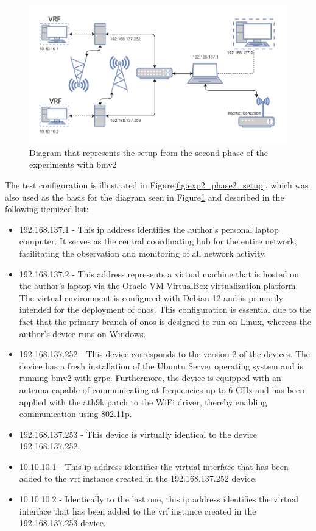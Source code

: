 \begin{figure}
	\centering
	\includegraphics[width=\textwidth]{Chapters/Figures/tests/bmv2_phase_2/setup_diagram.PNG}
	\caption{Diagram that represents the setup from the second phase of the experiments with \gls{bmv2}}
	\label{fig:exp2_phase2_diagram}
\end{figure}


The test configuration is illustrated in Figure\ref{fig:exp2_phase2_setup}, which was also used as the basis for the diagram seen in Figure\ref{fig:exp2_phase2_diagram} and described in the following itemized list:

\begin{itemize}
	\item 192.168.137.1 - This \gls{ip} address identifies the author's personal laptop computer. It serves as the central coordinating hub for the entire network, facilitating the observation and monitoring of all network activity.
	\item 192.168.137.2 - This address represents a virtual machine that is hosted on the author's laptop via the Oracle VM VirtualBox virtualization platform. The virtual environment is configured with Debian 12 and is primarily intended for the deployment of \gls{onos}. This configuration is essential due to the fact that the primary branch of \gls{onos} is designed to run on Linux, whereas the author's device runs on Windows.
	\item 192.168.137.252 - This device corresponds to the version 2 of the devices. The device has a fresh installation of the Ubuntu Server operating system and is running \gls{bmv2} with grpc. Furthermore, the device is equipped with an antenna capable of communicating at frequencies up to 6 GHz and has been applied with the ath9k patch to the WiFi driver, thereby enabling communication using 802.11p.
	\item 192.168.137.253 - This device is virtually identical to the device 192.168.137.252.
	\item 10.10.10.1 - This \gls{ip} address identifies the virtual interface that has been added to the \gls{vrf} instance created in the 192.168.137.252 device.
	\item 10.10.10.2 - Identically to the last one, this \gls{ip} address identifies the virtual interface that has been added to the \gls{vrf} instance created in the 192.168.137.253 device.
\end{itemize}

